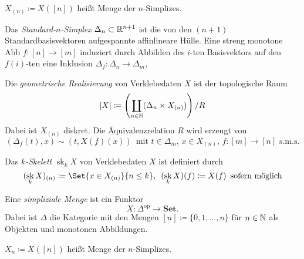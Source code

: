 \documentclass{cheat-sheet}
\newcommand{\SetC}{\mathbf{Set}} %
\newcommand{\op}{\mathrm{op}} %
\DeclareMathOperator{\sk}{sk} %
\begin{document}
\begin{nota}
  $X_{(n)} \coloneqq X([n])$ heißt Menge der $n$-Simplizes.
\end{nota}

\begin{defn}
  Das \emph{Standard-$n$-Simplex} $\Delta_n \subset \mathbb{R}^{n+1}$ ist die von den $(n{+}1)$ Standardbasisvektoren aufgespannte affinlineare Hülle. Eine streng monotone Abb $f : [n] \to [m]$ induziert durch Abbilden des $i$-ten Basisvektors auf den $f(i)$-ten eine Inklusion $\Delta_f : \Delta_n \to \Delta_m$, 
\end{defn}

\begin{defn}
  Die \emph{geometrische Realisierung} von Verklebedaten $X$ ist der topologische Raum
  \[ \lvert X\rvert \coloneqq \left( \coprod_{n \in \mathbb{N}} (\Delta_n \times X_{(n)}) \right) / R \]
  Dabei ist $X_{(n)}$ diskret. Die Äquivalenzrelation $R$ wird erzeugt von
  \[
    (\Delta_f(t), x) \sim (t, X(f)(x)) \enspace
    \text{mit $t \in \Delta_m$, $x \in X_{(n)}$, $f : [m] {\to} [n]$ s.m.s.}
  \]
\end{defn}


\begin{defn}
  Das \emph{$k$-Skelett} $\sk_k X$ von Verklebedaten $X$ ist definiert durch
  \[
    (\sk_k X)_{(n)} \coloneqq
    \Set{ x \in X_{(n)} }{ n \leq k }, \enspace
    (\sk_k X)(f) \coloneqq X(f) \enspace \text{sofern möglich}
  \]
\end{defn}



\begin{defn}
  Eine \emph{simpliziale Menge} ist ein Funktor
  \[ X : \Delta^\op \to \SetC. \]
  Dabei ist $\Delta$ die Kategorie mit den Mengen
  $[n] \coloneqq \{ 0, 1, \ldots, n \}$ für $n \in \mathbb{N}$ als Objekten und monotonen Abbildungen.
\end{defn}

\begin{nota}
  $X_n \coloneqq X([n])$ heißt Menge der $n$-Simplizes.
\end{nota}
\end{document}
